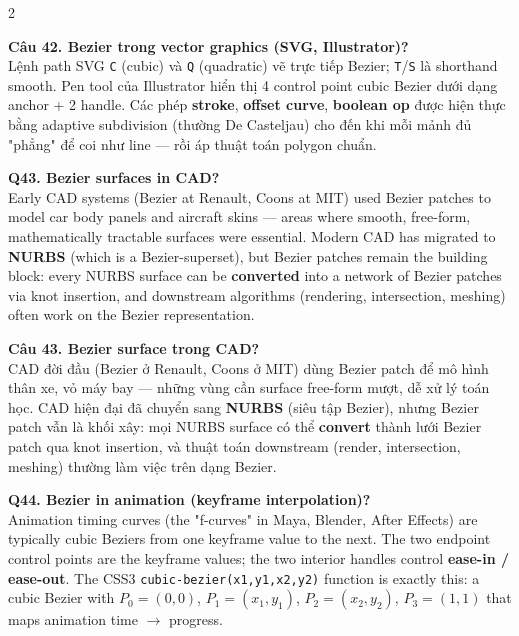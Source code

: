 \begin{paracol}{2}
\switchcolumn

\textbf{Câu 42. Bezier trong vector graphics (SVG, Illustrator)?}\\
Lệnh path SVG \texttt{C} (cubic) và \texttt{Q} (quadratic) vẽ trực tiếp Bezier; \texttt{T}/\texttt{S} là shorthand smooth. Pen tool của Illustrator hiển thị 4 control point cubic Bezier dưới dạng anchor + 2 handle. Các phép \textbf{stroke}, \textbf{offset curve}, \textbf{boolean op} được hiện thực bằng adaptive subdivision (thường De Casteljau) cho đến khi mỗi mảnh đủ "phẳng" để coi như line — rồi áp thuật toán polygon chuẩn.

\switchcolumn*

\textbf{Q43. Bezier surfaces in CAD?}\\
Early CAD systems (Bezier at Renault, Coons at MIT) used Bezier patches to model car body panels and aircraft skins — areas where smooth, free-form, mathematically tractable surfaces were essential. Modern CAD has migrated to \textbf{NURBS} (which is a Bezier-superset), but Bezier patches remain the building block: every NURBS surface can be \textbf{converted} into a network of Bezier patches via knot insertion, and downstream algorithms (rendering, intersection, meshing) often work on the Bezier representation.

\switchcolumn

\textbf{Câu 43. Bezier surface trong CAD?}\\
CAD đời đầu (Bezier ở Renault, Coons ở MIT) dùng Bezier patch để mô hình thân xe, vỏ máy bay — những vùng cần surface free-form mượt, dễ xử lý toán học. CAD hiện đại đã chuyển sang \textbf{NURBS} (siêu tập Bezier), nhưng Bezier patch vẫn là khối xây: mọi NURBS surface có thể \textbf{convert} thành lưới Bezier patch qua knot insertion, và thuật toán downstream (render, intersection, meshing) thường làm việc trên dạng Bezier.

\switchcolumn*

\textbf{Q44. Bezier in animation (keyframe interpolation)?}\\
Animation timing curves (the "f-curves" in Maya, Blender, After Effects) are typically cubic Beziers from one keyframe value to the next. The two endpoint control points are the keyframe values; the two interior handles control \textbf{ease-in / ease-out}. The CSS3 \texttt{cubic-bezier(x1,y1,x2,y2)} function is exactly this: a cubic Bezier with $P_0=(0,0)$, $P_1=(x_1,y_1)$, $P_2=(x_2,y_2)$, $P_3=(1,1)$ that maps animation time $\to$ progress.

\switchcolumn


\end{paracol}
